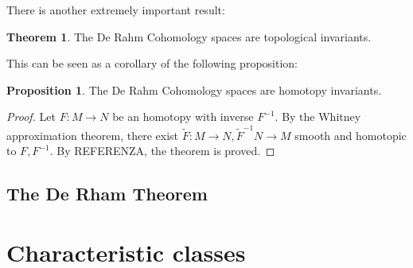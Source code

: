 \documentclass[12pt,a4paper]{report}
\theoremstyle{definition}
\theoremstyle{Theorem}
\newtheorem{Theo}[Def]{Theorem}
\newtheorem{Prop}[Def]{Proposition}
\theoremstyle{break}
\theoremstyle{definition}
\begin{document}
	There is another extremely important result:
	\begin{Theo}
		The De Rahm Cohomology spaces are topological invariants.
	\end{Theo}
	This can be seen as a corollary of the following proposition:
	\begin{Prop}
		The De Rahm Cohomology spaces are homotopy invariants.
	\end{Prop}
	\begin{proof}
		Let $F:M\rightarrow N$ be an homotopy with inverse $F^{-1}$. By the Whitney approximation theorem, there exist $\tilde{F}:M\rightarrow N,\tilde{F}^{-1}N\rightarrow M$ smooth and homotopic to $F,F^{-1}$. By REFERENZA, the theorem is proved.
	\end{proof}
	\section{The De Rham Theorem}	
	\chapter{Characteristic classes}
\end{document}
